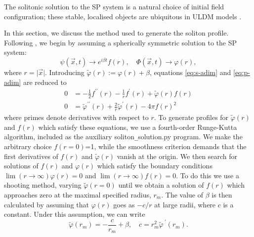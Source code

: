 \documentclass[a4paper,11pt]{article}
\begin{document}
The solitonic solution to the SP system is a natural choice of initial field configuration; these stable, localised objects are ubiquitous in ULDM models \cite{Marsh2015}. 



In this section, we discuss the method used to generate the soliton profile. Following \cite{Paredes2016}, we begin by assuming a spherically symmetric solution to the SP system:
\begin{equation}
    \psi(\vec{x},t)\rightarrow e^{i\beta t} f(r), \quad \Phi(\vec{x},t)\rightarrow \varphi(r),
\end{equation}
where $r=\vert\vec{x}\vert$. Introducing $\tilde{\varphi}(r):=\varphi(r)+\beta$, equations \ref{eq:s-adim} and \ref{eq:p-adim} are reduced to
\begin{align}
    0 &= -\frac{1}{2}f^{\prime\prime}(r)-\frac{1}{r}f^\prime(r)+\tilde{\varphi}(r)f(r)\label{eq:s-spherical}\\
    0 &= \tilde{\varphi}^{\prime\prime}(r)+\frac{2}{r}\tilde{\varphi}^\prime(r)-4\pi f(r)^2\label{eq:p-spherical}
\end{align}
where primes denote derivatives with respect to $r$. To generate profiles for $\tilde{\varphi}(r)$ and $f(r)$ which satisfy these equations, we use a fourth-order Runge-Kutta algorithm, included as the auxiliary soliton\texttt{\_}solution.py program. We make the arbitrary choice $f(r=0)$=1, while the smoothness criterion demands that the first derivatives of $f(r)$ and $\tilde{\varphi}(r)$ vanish at the origin. We then search for solutions of $f(r)$ and $\varphi(r)$ which satisfy the boundary conditions $\operatorname{lim}(r\rightarrow\infty)\varphi(r)=0$ and $\operatorname{lim}(r\rightarrow\infty)f(r)=0$. To do this we use a shooting method, varying $\tilde{\varphi}(r=0)$ until we obtain a solution of $f(r)$ which approaches zero at the maximal specified radius, $r_m$. The value of $\beta$ is then calculated by assuming that $\varphi(r)$ goes as $-c/r$ at large radii, where $c$ is a constant. Under this assumption, we can write
\begin{equation}
    \tilde{\varphi}(r_m)=-\frac{c}{r_m}+\beta, \quad c=r_m^2\tilde{\varphi}^{\ \prime}(r_m).
\end{equation}
\end{document}
